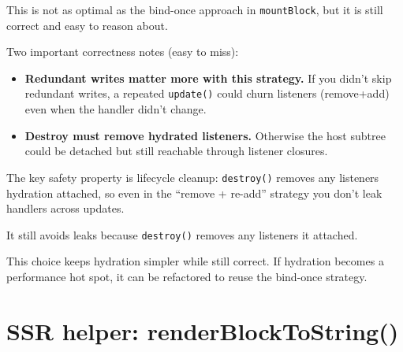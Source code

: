 This is not as optimal as the bind-once approach in \texttt{mountBlock}, but it is still correct and easy to reason about.

Two important correctness notes (easy to miss):

\begin{itemize}
  \item \textbf{Redundant writes matter more with this strategy.} If you didn’t skip redundant writes, a repeated \texttt{update()} could churn listeners (remove+add) even when the handler didn’t change.
  \item \textbf{Destroy must remove hydrated listeners.} Otherwise the host subtree could be detached but still reachable through listener closures.
\end{itemize}

\begin{center}
\end{center}

The key safety property is lifecycle cleanup: \texttt{destroy()} removes any listeners hydration attached, so even in the “remove + re-add” strategy you don’t leak handlers across updates.

It still avoids leaks because \texttt{destroy()} removes any listeners it attached.

This choice keeps hydration simpler while still correct. If hydration becomes a performance hot spot, it can be refactored to reuse the bind-once strategy.

\section{SSR helper: renderBlockToString()}

